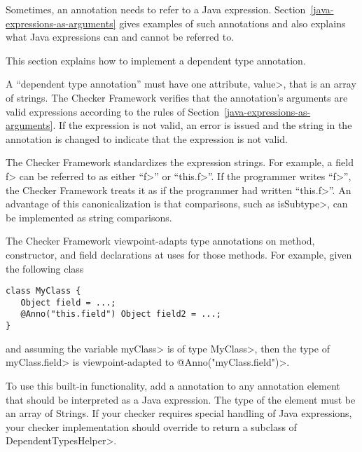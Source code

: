 
Sometimes, an annotation needs to refer to a Java expression.
Section~\ref{java-expressions-as-arguments} gives examples of such
annotations and also explains what Java expressions can and cannot be
referred to.

This section explains how to implement a dependent type annotation.

A ``dependent type annotation''
must have one attribute, \<value>, that is an
array of strings.  The Checker Framework verifies that the annotation's
arguments are valid expressions according to the rules of
Section~\ref{java-expressions-as-arguments}.  If
the expression is not valid, an error is issued and the string in the
annotation is changed to indicate that the expression is not valid.

The Checker Framework standardizes the expression strings.  For example, a
field \<f> can be referred to as either ``\<f>'' or ``\<this.f>''.  If the
programmer writes ``\<f>'', the Checker Framework treats it
as if the programmer had written ``\<this.f>''.
An advantage of this canonicalization is
that comparisons, such as \<isSubtype>, can be implemented as string comparisons.

The Checker Framework viewpoint-adapts type annotations on method, constructor,
and field declarations at uses for those methods.  For example, given the
following class

\begin{Verbatim}
class MyClass {
   Object field = ...;
   @Anno("this.field") Object field2 = ...;
}
\end{Verbatim}
and assuming the variable \<myClass> is of type \<MyClass>, then the type of
\<myClass.field> is viewpoint-adapted to \<@Anno("myClass.field")>.

To use this built-in functionality, add a  annotation
to any annotation element that should be interpreted as a Java expression.  The type of the
element must be an array of Strings.  If your checker requires special handling of Java expressions,
your checker implementation should override
to return a subclass of \<DependentTypesHelper>.

